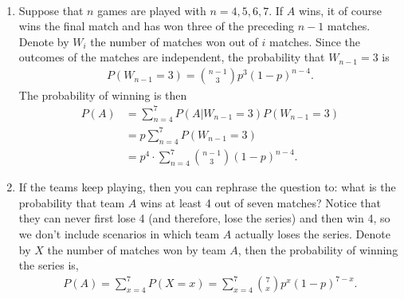 
\setcounter{theorem}{17}
\begin{exercise}[BH.3.18]
\begin{solution}~
	\begin{enumerate}
	    \item Suppose that $n$ games are played with $n = 4,5,6,7$. If $A$ wins, it of course wins the final match and has won three of the preceding $n-1$ matches. Denote by $W_{i}$ the number of matches won out of $i$ matches. Since the outcomes of the matches are independent, the probability that $W_{n-1}=3$ is
        \begin{align*}
        	P(W_{n-1}=3) = {n-1 \choose 3}p^{3}(1-p)^{n-4}.
        \end{align*}
        The probability of winning is then
        \begin{align*}
        	P(A)& =\sum_{n=4}^{7}P(A|W_{n-1}=3)P(W_{n-1}=3)\\
        	&=p\sum_{n=4}^{7}P(W_{n-1}=3)\\
        	&=p^4\cdot \sum_{n=4}^{7}{n-1 \choose 3}(1-p)^{n-4}.
        \end{align*}
        \item If the teams keep playing, then you can rephrase the question to: what is the probability that team $A$ wins at least 4 out of seven matches? Notice that they can never first lose 4 (and therefore, lose the series) and then win 4, so we don't include scenarios in which team $A$ actually loses the series. Denote by $X$ the number of matches won by team $A$, then the probability of winning the series is,
        \begin{align*}
        	P(A) = \sum_{x=4}^{7}P(X=x) = \sum_{x=4}^{7}{7 \choose x}p^{x}(1-p)^{7-x}.
        \end{align*}
	\end{enumerate}
\end{solution}
\end{exercise}


